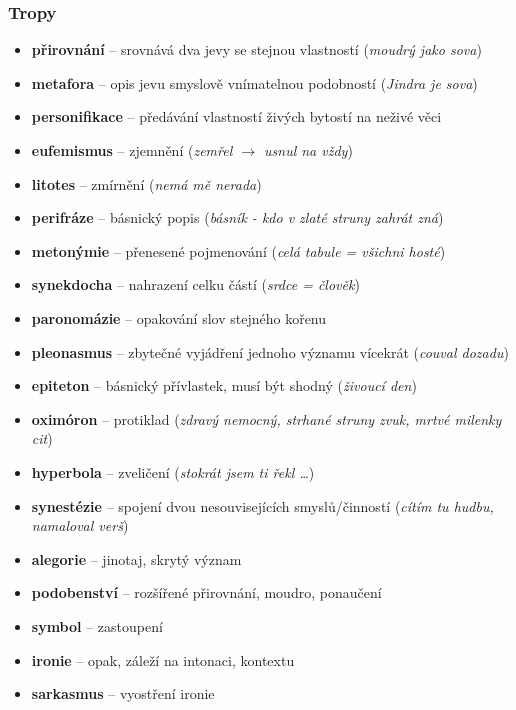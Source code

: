 \subsubsection{Tropy}
\begin{itemize}
\item[] \textbf{přirovnání} -- srovnává dva jevy se stejnou vlastností (\textit{moudrý jako sova})
\item[] \textbf{metafora} -- opis jevu smyslově vnímatelnou podobností (\textit{Jindra je sova})
\item[] \textbf{personifikace} -- předávání vlastností živých bytostí na neživé věci
\item[] \textbf{eufemismus} -- zjemnění (\textit{zemřel $\rightarrow$ usnul na vždy})
\item[] \textbf{litotes} -- zmírnění (\textit{nemá mě nerada})
\item[] \textbf{perifráze} -- básnický popis (\textit{básník - kdo v zlaté struny zahrát zná})
\item[] \textbf{metonýmie} -- přenesené pojmenování (\textit{celá tabule = všichni hosté})
\item[] \textbf{synekdocha} -- nahrazení celku částí (\textit{srdce = člověk})
\item[] \textbf{paronomázie} -- opakování slov stejného kořenu
\item[] \textbf{pleonasmus} -- zbytečné vyjádření jednoho významu vícekrát (\textit{couval dozadu})
\item[] \textbf{epiteton} -- básnický přívlastek, musí být shodný (\textit{živoucí den})
\item[] \textbf{oximóron} -- protiklad (\textit{zdravý nemocný, strhané struny zvuk, mrtvé milenky cit})
\item[] \textbf{hyperbola} -- zveličení (\textit{stokrát jsem ti řekl \ldots})
\item[] \textbf{synestézie} -- spojení dvou nesouvisejících smyslů/činností (\textit{cítím tu hudbu, namaloval verš})
\item[] \textbf{alegorie} -- jinotaj, skrytý význam
\item[] \textbf{podobenství} -- rozšířené přirovnání, moudro, ponaučení
\item[] \textbf{symbol} -- zastoupení
\item[] \textbf{ironie} -- opak, záleží na intonaci, kontextu
\item[] \textbf{sarkasmus} -- vyostření ironie
\end{itemize}


